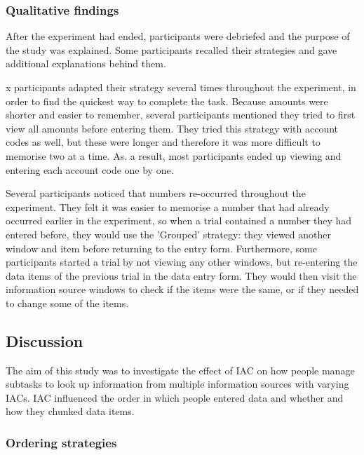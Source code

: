 \subsubsection{Qualitative findings}
After the experiment had ended, participants were debriefed and the purpose of the study was explained. Some participants recalled their strategies and gave additional explanations behind them.

x participants adapted their strategy several times throughout the experiment, in order to find the quickest way to complete the task. Because amounts were shorter and easier to remember, several participants mentioned they tried to first view all amounts before entering them. They tried this strategy with account codes as well, but these were longer and therefore it was more difficult to memorise two at a time. As. a result, most participants ended up viewing and entering each account code one by one.

Several participants noticed that numbers re-occurred throughout the experiment. They felt it was easier to memorise a number that had already occurred earlier in the experiment, so when a trial contained a number they had entered before, they would use the 'Grouped' strategy: they viewed another window and item before returning to the entry form. Furthermore, some participants started a trial by not viewing any other windows, but re-entering the data items of the previous trial in the data entry form. They would then visit the information source windows to check if the items were the same, or if they needed to change some of the items.

\subsection{Discussion}
The aim of this study was to investigate the effect of IAC on how people manage subtasks to look up information from multiple information sources with varying IACs. IAC influenced the order in which people entered data and whether and how they chunked data items. 

\subsubsection{Ordering strategies}

